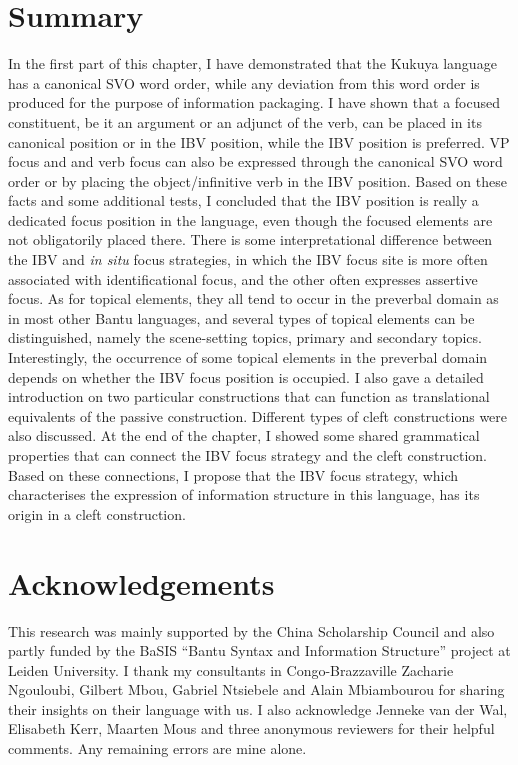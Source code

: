 \documentclass[output=paper,colorlinks,citecolor=brown,
]{langscibook}
\begin{document}
\section{Summary}\label{teke:sec:6}
In the first part of this chapter, I have demonstrated that the Kukuya language has a canonical SVO word order, while any deviation from this word order is produced for the purpose of information packaging. I have shown that a focused constituent, be it an argument or an adjunct of the verb, can be placed in its canonical position or in the IBV position, while the IBV position is preferred. VP focus and and verb focus can also be expressed through the canonical SVO word order or by placing the object/infinitive verb in the IBV position. Based on these facts and some additional tests, I concluded that the IBV position is really a dedicated focus position in the language, even though the focused elements are not obligatorily placed there. There is some interpretational difference between the IBV and \textit{in situ} focus strategies, in which the IBV focus site is more often associated with identificational focus, and the other often expresses assertive focus. As for topical elements, they all tend to occur in the preverbal domain as in most other Bantu languages, and several types of topical elements can be distinguished, namely the scene-setting topics, primary and secondary topics. Interestingly, the occurrence of some topical elements in the preverbal domain depends on whether the IBV focus position is occupied. I also gave a detailed introduction on two particular constructions that can function as translational equivalents of the passive construction. Different types of cleft constructions were also discussed. At the end of the chapter, I showed some shared grammatical properties that can connect the IBV focus strategy and the cleft construction. Based on these connections, I propose that the IBV focus strategy, which characterises the expression of information structure in this language, has its origin in a cleft construction.

\section*{Acknowledgements}
This research was mainly supported by the China Scholarship Council and also partly funded by the BaSIS “Bantu Syntax and Information Structure” project at Leiden University. I thank my consultants in Congo-Brazzaville Zacharie Ngouloubi, Gilbert Mbou, Gabriel Ntsiebele and Alain Mbiambourou for sharing their insights on their language with us. I also acknowledge Jenneke van der Wal, Elisabeth Kerr, Maarten Mous and three anonymous reviewers for their helpful comments. Any remaining errors are mine alone.
\end{document}

